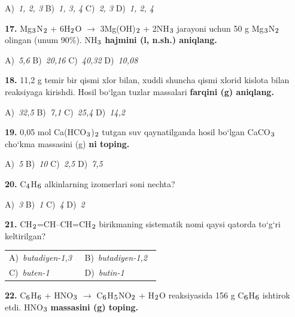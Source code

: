 \documentclass[11pt,a4paper]{article}
\renewcommand{\textsubscript}[1]{\ensuremath{_{\text{\fontsize{8}{8}\selectfont #1}}}}
\begin{document}
\begin{multicols}{2}
\noindent A)~\textsl{1, 2, 3} \hfill B)~\textsl{1, 3, 4} \hfill C)~\textsl{2, 3} \hfill D)~\textsl{1, 2, 4}\par
\vspace{4pt}
\noindent\textbf{17.} Mg\textsubscript{3}N\textsubscript{2} + 6H\textsubscript{2}O $\to$ 3Mg(OH)\textsubscript{2} + 2NH\textsubscript{3} jarayoni uchun 50 g Mg\textsubscript{3}N\textsubscript{2} olingan (unum 90\%). NH\textsubscript{3} \textbf{hajmini (l, n.sh.) aniqlang.}

\noindent A)~\textsl{5,6} \hfill B)~\textsl{20,16} \hfill C)~\textsl{40,32} \hfill D)~\textsl{10,08}\par
\vspace{4pt}
\noindent\textbf{18.} 11,2 g temir bir qismi xlor bilan, xuddi shuncha qismi xlorid kislota bilan reaksiyaga kirishdi. Hosil bo`lgan tuzlar massalari \textbf{farqini (g) aniqlang.}

\noindent A)~\textsl{32,5} \hfill B)~\textsl{7,1} \hfill C)~\textsl{25,4} \hfill D)~\textsl{14,2}\par
\vspace{4pt}
\noindent\textbf{19.} 0,05 mol Ca(HCO\textsubscript{3})\textsubscript{2} tutgan suv qaynatilganda hosil bo`lgan CaCO\textsubscript{3} cho`kma massasini (g)  \textbf{ni toping.}

\noindent A)~\textsl{5} \hfill B)~\textsl{10} \hfill C)~\textsl{2,5} \hfill D)~\textsl{7,5}\par
\vspace{4pt}
\noindent\textbf{20.} C\textsubscript{4}H\textsubscript{6} alkinlarning izomerlari soni nechta?

\noindent A)~\textsl{3} \hfill B)~\textsl{1} \hfill C)~\textsl{4} \hfill D)~\textsl{2}\par
\vspace{4pt}
\noindent\textbf{21.} CH\textsubscript{2}=CH--CH=CH\textsubscript{2} birikmaning sistematik nomi qaysi qatorda to`g`ri keltirilgan?

\noindent\begin{tabular}{@{}p{0.47\linewidth}@{}p{0.47\linewidth}@{}}
A)~\textsl{butadiyen-1,3} & B)~\textsl{butadiyen-1,2} \\
C)~\textsl{buten-1} & D)~\textsl{butin-1} \\
\end{tabular}\par
\vspace{4pt}
\noindent\textbf{22.} C\textsubscript{6}H\textsubscript{6} + HNO\textsubscript{3} $\to$ C\textsubscript{6}H\textsubscript{5}NO\textsubscript{2} + H\textsubscript{2}O reaksiyasida 156 g C\textsubscript{6}H\textsubscript{6} ishtirok etdi. HNO\textsubscript{3} \textbf{massasini (g) toping.}


\end{multicols}
\end{document}
